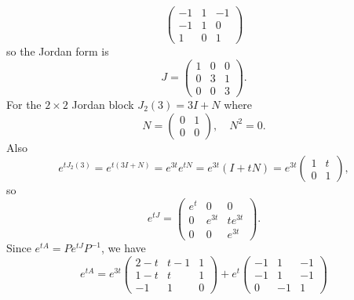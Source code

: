 \documentclass{exam}
\begin{document}
\begin{solution}
\[\begin{pmatrix}
            -1 & 1 & -1 \\
            -1 & 1 & 0 \\
            1 & 0 & 1
        \end{pmatrix}
    \]
    so the Jordan form is 
    \[
        J = \begin{pmatrix}
            1 & 0 & 0 \\
            0 & 3 & 1 \\
            0 & 0 & 3
        \end{pmatrix}.
    \]
    For the $2 \times 2$ Jordan block $J_2(3) = 3I + N$ where 
    \[
        N = \begin{pmatrix}
            0 & 1 \\
            0 & 0
        \end{pmatrix},
        \quad N^2 = 0.
    \]
    Also 
    \[
        e^{tJ_{2}(3)} = e^{t(3I+N)} = e^{3t}e^{tN} = e^{3t}(I + tN) = e^{3t}\begin{pmatrix}
            1 & t \\ 0 & 1
        \end{pmatrix},
    \]
    so 
    \[
        e^{tJ} = \begin{pmatrix}
            e^t & 0 & 0 \\
            0 & e^{3t} & te^{3t} \\
            0 & 0 & e^{3t}
        \end{pmatrix}.
    \]
    Since $e^{tA} = Pe^{tJ}P^{-1}$, we have 
    \[
        \boxed{
            e^{tA} = e^{3t}\begin{pmatrix}
                2 - t & t - 1 & 1 \\
                1 - t & t & 1 \\
                -1 & 1 & 0
            \end{pmatrix}
            + e^t \begin{pmatrix}
                -1 & 1 & -1 \\
                -1 & 1 & -1 \\
                0 & -1 & 1
            \end{pmatrix}
        }
    \]
\end{solution}
\end{document}

